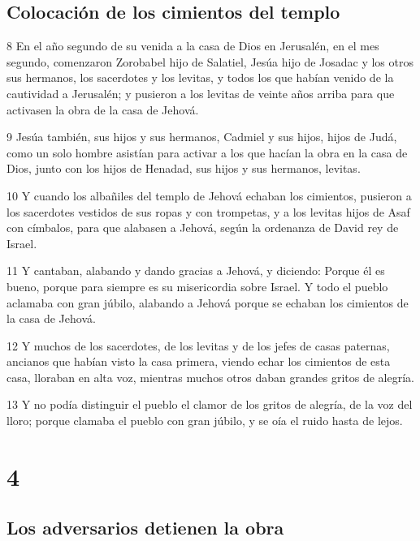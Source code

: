 \section*{Colocación de los cimientos del templo}

\par 8 En el año segundo de su venida a la casa de Dios en Jerusalén, en el mes segundo, comenzaron Zorobabel hijo de Salatiel, Jesúa hijo de Josadac y los otros sus hermanos, los sacerdotes y los levitas, y todos los que habían venido de la cautividad a Jerusalén; y pusieron a los levitas de veinte años arriba para que activasen la obra de la casa de Jehová.
\par 9 Jesúa también, sus hijos y sus hermanos, Cadmiel y sus hijos, hijos de Judá, como un solo hombre asistían para activar a los que hacían la obra en la casa de Dios, junto con los hijos de Henadad, sus hijos y sus hermanos, levitas.
\par 10 Y cuando los albañiles del templo de Jehová echaban los cimientos, pusieron a los sacerdotes vestidos de sus ropas y con trompetas, y a los levitas hijos de Asaf con címbalos, para que alabasen a Jehová, según la ordenanza de David rey de Israel. 
\par 11 Y cantaban, alabando y dando gracias a Jehová, y diciendo: Porque él es bueno, porque para siempre es su misericordia sobre Israel. Y todo el pueblo aclamaba con gran júbilo, alabando a Jehová porque se echaban los cimientos de la casa de Jehová.
\par 12 Y muchos de los sacerdotes, de los levitas y de los jefes de casas paternas, ancianos que habían visto la casa primera, viendo echar los cimientos de esta casa, lloraban en alta voz, mientras muchos otros daban grandes gritos de alegría.
\par 13 Y no podía distinguir el pueblo el clamor de los gritos de alegría, de la voz del lloro; porque clamaba el pueblo con gran júbilo, y se oía el ruido hasta de lejos.

\chapter{4}

\section*{Los adversarios detienen la obra}

